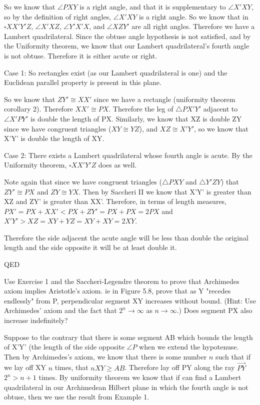 \documentclass[12pt,letterpaper]{article}
\newcommand{\Proof}{\noindent {\bf Proof: }}
\newcommand{\QED}{\begin{flushright}QED\end{flushright}}
\newcommand{\prob}[1]{\newpage\noindent {\bf #1}}
\begin{document}
So we know that $\angle PXY$ is a right angle, and that it is supplementary to $\angle X'XY$, so by the definition of right angles, $\angle X'XY$ is a right angle.  So we know that in $\square XX'Y'Z$, $\angle X'XZ$, $\angle Y'X'X$, and $\angle XZY'$ are all right angles. Therefore we have a Lambert quadrilateral.  Since the obtuse angle hypothesis is not satisfied, and by the Uniformity theorem, we know that our Lambert quadrilateral's fourth angle is not obtuse.  Therefore it is either acute or right. 

Case 1: So rectangles exist (as our Lambert quadrilateral is one) and the Euclidean parallel property is present in this plane.

So we know that $ZY' \cong XX'$ since we have a rectangle (uniformity theorem corollary 2).  Therefore $XX' \cong PX$.  Therefore the leg of $\triangle PX'Y'$ adjacent to $\angle X'PY'$ is double the length of PX.  Similarly, we know that XZ is double ZY since we have congruent triangles ($XY \cong YZ$), and $XZ \cong X'Y'$, so we know that X'Y' is double the length of XY.  

Case 2: There exists a Lambert quadrilateral whose fourth angle is acute.  By the Uniformity theorem, $\square XX'Y'Z$ does as well.

Note again that since we have congruent triangles ($\triangle PXY$ and $\triangle Y'ZY$) that $ZY' \cong PX$ and $ZY \cong YX$.  Then by Saccheri II we know that X'Y' is greater than XZ and ZY' is greater than XX'.  Therefore, in terms of length measures, $PX' = PX + XX' < PX + ZY' = PX + PX = 2PX$ and $X'Y' > XZ = XY + YZ = XY + XY = 2XY$.  


Therefore the side adjacent the acute angle will be less than double the original length and the side opposite it will be at least double it. 

\QED






\prob{2} Use Exercise 1 and the Saccheri-Legendre theorem to prove that Archimedes axiom implies Aristotle's axiom.  ie in Figure 5.8, prove that as Y "recedes endlessly" from P, perpendicular segment XY increases without bound.  (Hint: Use Archimedes' axiom and the fact that $2^n \to \infty$ as $n\to \infty$.)  Does segment PX also increase indefinitely?\\


\Proof

Suppose to the contrary that there is some segment AB which bounds the length of X'Y' (the length of the side opposite $\angle P$ when we extend the hypotenuse. Then by Archimedes's axiom, we know that there is some number $n$ such that if we lay off XY $n$ times, that $nXY \geq AB$.  Therefore lay off PY along the ray $\overrightarrow{PY}$ $2^n > n+1$ times. By uniformity theorem we know that if can find a Lambert quadrilateral in our Archimedean Hilbert plane in which the fourth angle is not obtuse, then we use the result from Example 1.  \\
\end{document}
